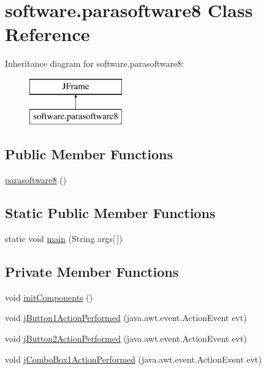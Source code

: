 \hypertarget{classsoftware_1_1parasoftware8}{}\section{software.\+parasoftware8 Class Reference}
\label{classsoftware_1_1parasoftware8}
Inheritance diagram for software.\+parasoftware8\+:\begin{figure}[H]
\begin{center}
\leavevmode
\includegraphics[height=2.000000cm]{classsoftware_1_1parasoftware8}
\end{center}
\end{figure}
\subsection*{Public Member Functions}
\begin{DoxyCompactItemize}
\item 
\mbox{\hyperlink{classsoftware_1_1parasoftware8_a0359e1d236b31fb9a86301dd11e12a7c}{parasoftware8}} ()
\end{DoxyCompactItemize}
\subsection*{Static Public Member Functions}
\begin{DoxyCompactItemize}
\item 
static void \mbox{\hyperlink{classsoftware_1_1parasoftware8_ac89e30a8f05551ca5de490c2dd5982e3}{main}} (String args\mbox{[}$\,$\mbox{]})
\end{DoxyCompactItemize}
\subsection*{Private Member Functions}
\begin{DoxyCompactItemize}
\item 
void \mbox{\hyperlink{classsoftware_1_1parasoftware8_af0d3201888a29fcd16582ef797d5572d}{init\+Components}} ()
\item 
void \mbox{\hyperlink{classsoftware_1_1parasoftware8_ac91bc1f9d8500c52e17769d1dcecec5b}{j\+Button1\+Action\+Performed}} (java.\+awt.\+event.\+Action\+Event evt)
\item 
void \mbox{\hyperlink{classsoftware_1_1parasoftware8_ab4ed9002057b4f91e7e73b08cae6e8f6}{j\+Button2\+Action\+Performed}} (java.\+awt.\+event.\+Action\+Event evt)
\item 
void \mbox{\hyperlink{classsoftware_1_1parasoftware8_a6787557a88e95173d633c83413960867}{j\+Combo\+Box1\+Action\+Performed}} (java.\+awt.\+event.\+Action\+Event evt)
\end{DoxyCompactItemize}
